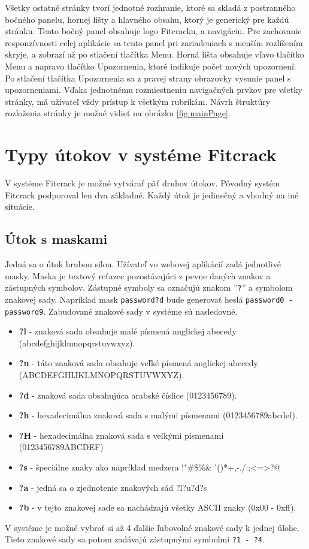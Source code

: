 \documentclass[slovak]{fitthesis}
\begin{document}
Všetky ostatné stránky tvorí jednotné rozhranie, ktoré sa skladá z postranného bočného panelu, hornej lišty a hlavného obsahu, ktorý je generický pre každú stránku. Tento bočný panel obsahuje logo Fitcracku, a navigáciu. Pre zachovanie responzívnosti celej aplikácie sa tento panel pri zariadeniach  s menším rozlíšením skryje, a zobrazí až po stlačení tlačítka Menu. Horná lišta obsahuje vľavo tlačítko Menu a napravo tlačítko Upozornenia, ktoré indikuje počet nových upozornení. Po stlačení tlačítka Upozornenia sa z pravej strany obrazovky vysunie panel s upozorneniami. Vďaka jednotnému rozmiestneniu navigačných prvkov pre všetky stránky, má užívateľ vždy prístup k všetkým rubrikám. Návrh štruktúry rozloženia stránky je možné vidieť na obrázku \ref{fig:mainPage}.


\section{Typy útokov v systéme Fitcrack}
V systéme Fitcrack je možné vytvárať päť druhov útokov. Pôvodný systém Fitcrack podporoval len dva základné. Každý útok je jedinečný a vhodný na iné situácie.


\subsection{Útok s maskami} \label{maskAttack}
Jedná sa o útok hrubou silou. Užívateľ  vo webovej aplikácií zadá jednotlivé masky. Maska je textový reťazec pozostávajúci z pevne daných znakov a zástupných symbolov. Zástupné symboly sa označujú znakom ''\texttt{?}'' a symbolom znakovej sady. Napríklad mask \texttt{password?d} bude generovať heslá \texttt{password0 - password9}. Zabudované znakové sady v systéme sú nasledovné.
\begin{itemize}
    \item \textbf{?l} - znaková sada obsahuje malé písmená anglickej abecedy (abcdefghijklmnopqrstuvwxyz).
    \item \textbf{?u} - táto znaková sada obsahuje veľké písmená anglickej abecedy (ABCDEFGHIJKLMNOPQRSTUVWXYZ).
    \item \textbf{?d} - znaková sada obsahujúca arabské číslice (0123456789).
    \item \textbf{?h} - hexadecimálna znaková sada s malými písmenami (0123456789abcdef).
    \item \textbf{?H} - hexadecimálna znaková sada s veľkými písmenami (0123456789ABCDEF)
    \item \textbf{?s} - špeciálne znaky ako napríklad medzera !"\#\$\%\&
    '()*+,-./:;<=>?@
    \item \textbf{?a} - jedná sa o zjednotenie znakových sád ?l?u?d?s
    \item \textbf{?b} - v tejto znakovej sade sa nachádzajú všetky ASCII znaky (0x00 - 0xff).
\end{itemize}
V systéme je možné vybrať si až 4 ďalšie ľubovolné znakové sady k jednej úlohe. Tieto znakové sady sa potom zadávajú zástupnými symbolmi \texttt{?1 - ?4}.
\end{document}
